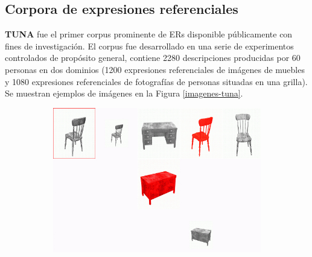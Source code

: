 \subsection{Corpora de expresiones referenciales}
\label{sec:corpus2}
\label{sec:corpusTUNA}

{\bf TUNA} \cite{tuna-corpus} fue el primer corpus prominente de ERs disponible p\'ublicamente con fines de investigaci\'on. El corpus 
fue desarrollado en una serie de experimentos controlados de prop\'osito general, contiene 2280 descripciones producidas por 60 personas 
en dos dominios (1200 expresiones referenciales de im\'agenes de muebles y 1080 expresiones referenciales de fotograf\'ias de personas 
situadas en una grilla). Se muestran ejemplos de im\'agenes en la Figura \ref{imagenes-tuna}. 

\begin{figure}[!ht]
\begin{subfigure}{.5\textwidth}
\centering
\vspace*{.1cm}
\includegraphics[width=\textwidth]{images/largeGreyChair.jpg}\\[0pt]
\caption{}
\label{fig-TUNA-furniture}
\end{subfigure}
\hspace*{0cm}
\begin{subfigure}{.5\textwidth}
\centering
\vspace*{-.8cm}

\end{subfigure}
\end{figure}
